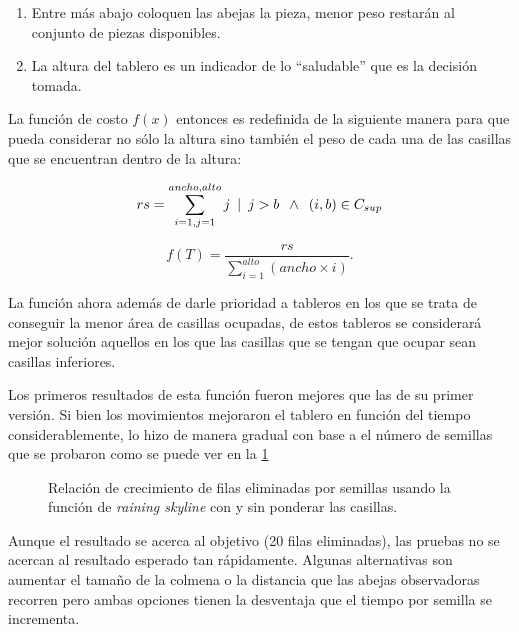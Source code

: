 \begin{enumerate}
\item Entre más abajo coloquen las abejas la pieza, menor peso restarán al conjunto de piezas 
disponibles. 

\item La altura del tablero es un indicador de lo ``saludable'' que es la decisión 
tomada. 
\end{enumerate}

La función de costo $f(x)$ entonces es redefinida de la siguiente manera para que 
pueda considerar no sólo la altura sino también el peso de cada una de las casillas que 
se encuentran dentro de la altura:

\begin{displaymath}
  rs = \sum_{i=1,j=1}^{ancho, alto} j \enskip | \enskip j > b \enskip \land \enskip (i,b) \in C_{sup} 
  \end{displaymath} 

  \begin{displaymath}
    f(T) = \frac{rs}{\sum\limits_{i=1}^{alto} (ancho \times i)}.
\end{displaymath} 


La función ahora además de darle prioridad a tableros en los que 
se trata de conseguir la menor área de casillas ocupadas, de estos tableros 
se considerará mejor solución aquellos en los que las casillas que se 
tengan que ocupar sean casillas inferiores. 

Los primeros resultados de esta 
función fueron mejores que las de su primer versión. Si bien los movimientos 
mejoraron el tablero en función del tiempo considerablemente, lo hizo de manera 
gradual con base a el número de semillas que se probaron como se puede ver en 
la \cref{fig:rainingskylinenopdos}

\begin{figure}[h]

\caption[short caption]{Relación de crecimiento de filas eliminadas por semillas usando 
la función de \emph{raining skyline} con y sin ponderar las casillas.}
\label{fig:rainingskylinenopdos}
\end{figure} 

Aunque el resultado se acerca al objetivo (20 filas eliminadas), las pruebas 
no se acercan al resultado esperado tan rápidamente. Algunas alternativas son
aumentar el tamaño de la colmena o la distancia que las abejas observadoras 
recorren pero ambas opciones tienen la desventaja que el tiempo por semilla se 
incrementa. 


